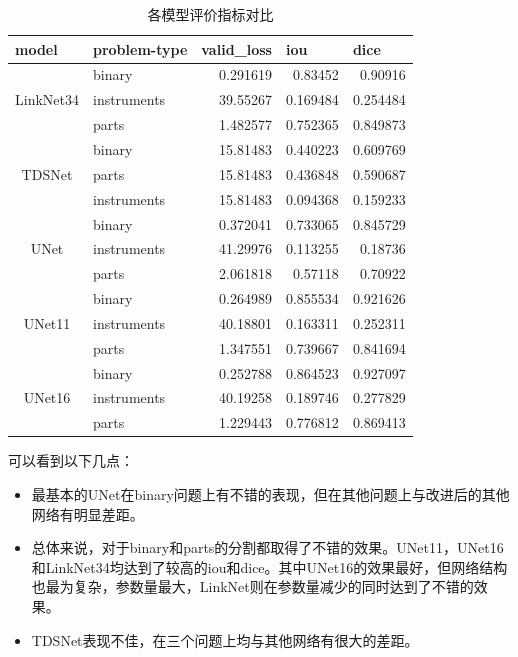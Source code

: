 \documentclass[UTF8]{ctexart}
\begin{document}
\begin{table}[H]
    \centering
    \caption{各模型评价指标对比}
      \begin{tabular}{clrrr}
        \toprule
      \multicolumn{1}{l}{model} & problem-type & \multicolumn{1}{l}{valid\_loss} & \multicolumn{1}{l}{iou} & \multicolumn{1}{l}{dice} \\
        \midrule
      \multirow{3}[0]{*}{LinkNet34} & binary & 0.291619 & 0.83452 & 0.90916 \\
            & instruments & 39.55267 & 0.169484 & 0.254484 \\
            & parts & 1.482577 & 0.752365 & 0.849873 \\
            \midrule
      \multirow{3}[0]{*}{TDSNet} & binary & 15.81483 & 0.440223 & 0.609769 \\
            & parts & 15.81483 & 0.436848 & 0.590687 \\
            & instruments & 15.81483 & 0.094368 & 0.159233 \\
            \midrule
      \multirow{3}[0]{*}{UNet} & binary & 0.372041 & 0.733065 & 0.845729 \\
            & instruments & 41.29976 & 0.113255 & 0.18736 \\
            & parts & 2.061818 & 0.57118 & 0.70922 \\
            \midrule
      \multirow{3}[0]{*}{UNet11} & binary & 0.264989 & 0.855534 & 0.921626 \\
            & instruments & 40.18801 & 0.163311 & 0.252311 \\
            & parts & 1.347551 & 0.739667 & 0.841694 \\
            \midrule
      \multirow{3}[0]{*}{UNet16} & binary & 0.252788 & 0.864523 & 0.927097 \\
            & instruments & 40.19258 & 0.189746 & 0.277829 \\
            & parts & 1.229443 & 0.776812 & 0.869413 \\
            \bottomrule
      \end{tabular}%
    \label{tab:addlabel}%
  \end{table}%
可以看到以下几点：
\begin{itemize}
    \item 最基本的UNet在binary问题上有不错的表现，但在其他问题上与改进后的其他网络有明显差距。
    \item 总体来说，对于binary和parts的分割都取得了不错的效果。UNet11，UNet16和LinkNet34均达到了较高的iou和dice。其中UNet16的效果最好，但网络结构也最为复杂，参数量最大，LinkNet则在参数量减少的同时达到了不错的效果。
    \item TDSNet表现不佳，在三个问题上均与其他网络有很大的差距。
\end{itemize}
\end{document}

